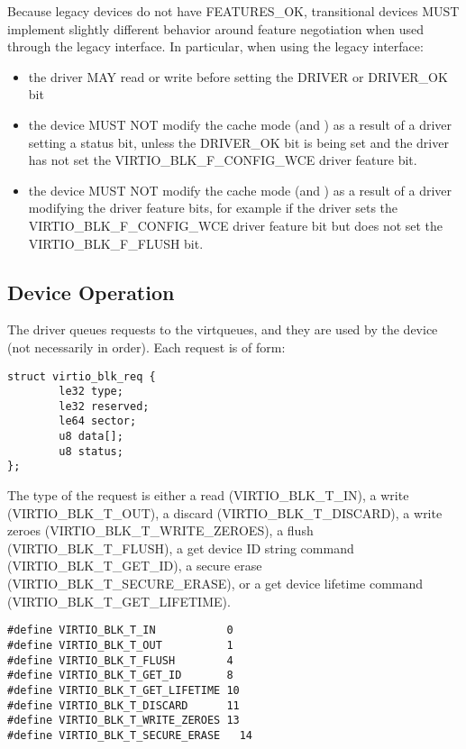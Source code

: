 Because legacy devices do not have FEATURES_OK, transitional devices
MUST implement slightly different behavior around feature negotiation
when used through the legacy interface.  In particular, when using the
legacy interface:

\begin{itemize}
\item the driver MAY read or write  before setting
  the DRIVER or DRIVER_OK  bit

\item the device MUST NOT modify the cache mode (and )
  as a result of a driver setting a status bit, unless
  the DRIVER_OK bit is being set and the driver has not set the
  VIRTIO_BLK_F_CONFIG_WCE driver feature bit.

\item the device MUST NOT modify the cache mode (and )
  as a result of a driver modifying the driver feature bits, for example
  if the driver sets the VIRTIO_BLK_F_CONFIG_WCE driver feature bit but
  does not set the VIRTIO_BLK_F_FLUSH bit.
\end{itemize}


\subsection{Device Operation}\label{sec:Device Types / Block Device / Device Operation}

The driver queues requests to the virtqueues, and they are used by
the device (not necessarily in order). Each request is of form:

\begin{lstlisting}
struct virtio_blk_req {
        le32 type;
        le32 reserved;
        le64 sector;
        u8 data[];
        u8 status;
};
\end{lstlisting}

The type of the request is either a read (VIRTIO_BLK_T_IN), a write
(VIRTIO_BLK_T_OUT), a discard (VIRTIO_BLK_T_DISCARD), a write zeroes
(VIRTIO_BLK_T_WRITE_ZEROES), a flush (VIRTIO_BLK_T_FLUSH), a get device ID
string command (VIRTIO_BLK_T_GET_ID), a secure erase
(VIRTIO_BLK_T_SECURE_ERASE), or a get device lifetime command
(VIRTIO_BLK_T_GET_LIFETIME).

\begin{lstlisting}
#define VIRTIO_BLK_T_IN           0
#define VIRTIO_BLK_T_OUT          1
#define VIRTIO_BLK_T_FLUSH        4
#define VIRTIO_BLK_T_GET_ID       8
#define VIRTIO_BLK_T_GET_LIFETIME 10
#define VIRTIO_BLK_T_DISCARD      11
#define VIRTIO_BLK_T_WRITE_ZEROES 13
#define VIRTIO_BLK_T_SECURE_ERASE   14
\end{lstlisting}

